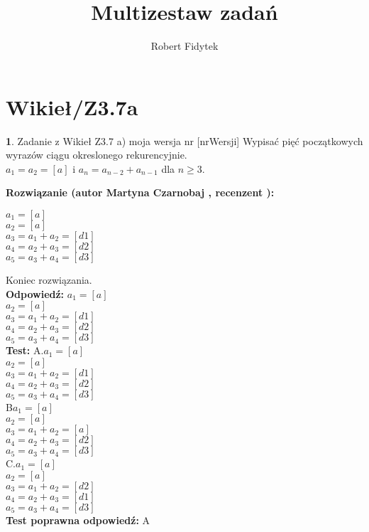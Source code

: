 \documentclass[12pt, a4paper]{article}
\title{Multizestaw zadań}
\author{Robert Fidytek}
\date{}
\theoremstyle{definition} %
\newtheorem{zad}{}
\newcommand{\kategoria}[1]{\section{#1}} %
\newcommand{\zadStart}[1]{\begin{zad}#1\newline} %
\newcommand{\zadStop}{\end{zad}}   %
\newcommand{\rozwStart}[2]{\noindent \textbf{Rozwiązanie (autor #1 , recenzent #2): }\newline} %
\newcommand{\rozwStop}{\newline}                                            %
\newcommand{\odpStart}{\noindent \textbf{Odpowiedź:}\newline}    %
\newcommand{\odpStop}{\newline}                                             %
\newcommand{\testStart}{\noindent \textbf{Test:}\newline} %
\newcommand{\testStop}{\newline} %
\newcommand{\kluczStart}{\noindent \textbf{Test poprawna odpowiedź:}\newline} %
\newcommand{\kluczStop}{\newline} %
\begin{document}
\maketitle


\kategoria{Wikieł/Z3.7a}
\zadStart{Zadanie z Wikieł Z3.7 a) moja wersja nr [nrWersji]}
Wypisać pięć początkowych wyrazów ciągu okreslonego rekurencyjnie.\\
$ a_{1} = a_{2} = [a] $ i $ a_{n} = a_{n-2} + a_{n-1} $ dla $ n \geq 3 $.\\
\zadStop
\rozwStart{Martyna Czarnobaj}{}
\begin{center}
	$ a_{1} = [a] $\\
	$ a_{2} = [a] $\\
	$ a_{3} = a_{1} + a_{2} = [d1] $\\
	$ a_{4} = a_{2} + a_{3} = [d2] $\\
	$ a_{5} = a_{3} + a_{4} = [d3] $\\
\end{center}

Koniec rozwiązania.\\
\rozwStop
\odpStart
$ a_{1} = [a] $\\
$ a_{2} = [a] $\\
$ a_{3} = a_{1} + a_{2} = [d1] $\\
$ a_{4} = a_{2} + a_{3} = [d2] $\\
$ a_{5} = a_{3} + a_{4} = [d3] $\\
\odpStop
\testStart
A.$ a_{1} = [a] $\\
$ a_{2} = [a] $\\
$ a_{3} = a_{1} + a_{2} = [d1] $\\
$ a_{4} = a_{2} + a_{3} = [d2] $\\
$ a_{5} = a_{3} + a_{4} = [d3] $\\
B$ a_{1} = [a] $\\
$ a_{2} = [a] $\\
$ a_{3} = a_{1} + a_{2} = [a] $\\
$ a_{4} = a_{2} + a_{3} = [d2] $\\
$ a_{5} = a_{3} + a_{4} = [d3] $\\
C.$ a_{1} = [a] $\\
$ a_{2} = [a] $\\
$ a_{3} = a_{1} + a_{2} = [d2] $\\
$ a_{4} = a_{2} + a_{3} = [d1] $\\
$ a_{5} = a_{3} + a_{4} = [d3] $\\
\testStop
\kluczStart
A
\kluczStop
\end{document}
